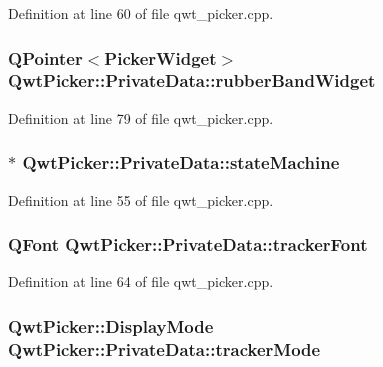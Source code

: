 Definition at line 60 of file qwt\-\_\-picker.\-cpp.

\hypertarget{class_qwt_picker_1_1_private_data_ae6cb698dbc93e67852cc2c8b16c83b97}{
\subsubsection[{rubber\-Band\-Widget}]{\setlength{\rightskip}{0pt plus 5cm}Q\-Pointer$<${\bf Picker\-Widget}$>$ Qwt\-Picker\-::\-Private\-Data\-::rubber\-Band\-Widget}}\label{class_qwt_picker_1_1_private_data_ae6cb698dbc93e67852cc2c8b16c83b97}


Definition at line 79 of file qwt\-\_\-picker.\-cpp.

\hypertarget{class_qwt_picker_1_1_private_data_a4740c1988aa42a22237b9e2920845d4c}{
\subsubsection[{state\-Machine}]{$\ast$ Qwt\-Picker\-::\-Private\-Data\-::state\-Machine}}\label{class_qwt_picker_1_1_private_data_a4740c1988aa42a22237b9e2920845d4c}


Definition at line 55 of file qwt\-\_\-picker.\-cpp.

\hypertarget{class_qwt_picker_1_1_private_data_a344744e98d6db33af4075055bf028807}{
\subsubsection[{tracker\-Font}]{\setlength{\rightskip}{0pt plus 5cm}Q\-Font Qwt\-Picker\-::\-Private\-Data\-::tracker\-Font}}\label{class_qwt_picker_1_1_private_data_a344744e98d6db33af4075055bf028807}


Definition at line 64 of file qwt\-\_\-picker.\-cpp.

\hypertarget{class_qwt_picker_1_1_private_data_a623a09fcc8836448b1c73239a8e48a09}{
\subsubsection[{tracker\-Mode}]{\setlength{\rightskip}{0pt plus 5cm}Qwt\-Picker\-::\-Display\-Mode Qwt\-Picker\-::\-Private\-Data\-::tracker\-Mode}}\label{class_qwt_picker_1_1_private_data_a623a09fcc8836448b1c73239a8e48a09}


